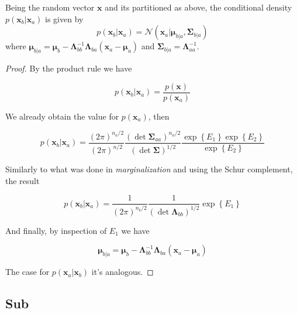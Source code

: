 \begin{appendices}
  \begin{theorem}[Conditioning]
    Being the random vector $\mathbf{x}$ and its partitioned as above, the conditional density $p(\mathbf{x}_b | \mathbf{x}_a)$ is given by
    \begin{displaymath}
      p(\mathbf{x}_b | \mathbf{x}_a) = \mathcal{N}\left( \mathbf{x}_a | \boldsymbol{\mu}_{b|a}, \boldsymbol{\Sigma}_{b|a} \right)
    \end{displaymath}
    where $\boldsymbol{\mu}_{b|a} = \boldsymbol{\mu}_{b}-\boldsymbol{\Lambda}_{b b}^{-1} \boldsymbol{\Lambda}_{b a}\left(\mathbf{x}_{a}-\boldsymbol{\mu}_{a}\right)$ and $\boldsymbol{\Sigma}_{b|a} = \boldsymbol{\Lambda}_{aa}^{-1}$.
  \end{theorem}

  \begin{proof}
    By the product rule we have

    \begin{equation}
      p(\mathbf{x}_b|\mathbf{x}_a)=\frac{p(\mathbf{x})}{p(\mathbf{x}_a)}
    \end{equation}

    We already obtain the value for $p(\mathbf{x}_a)$, then

    \begin{equation}
      p(\mathbf{x}_b|\mathbf{x}_a)=\frac{(2 \pi )^{n_a/2}}{\left( 2 \pi \right)^{n/2}} \frac{( \det \mathbf{\Sigma}_{aa} )^{n_a/2}}{\left( \det \boldsymbol{\Sigma} \right)^{1/2}} \frac{\exp \left\{ E_1 \right\} \exp \left\{ E_2 \right\}}{\exp \left\{ E_2 \right\}}
    \end{equation}
    
    Similarly to what was done in \textit{marginalization} and using the Schur complement, the result

    \begin{equation}
      p(\mathbf{x}_b|\mathbf{x}_a)=\frac{1}{\left( 2 \pi \right)^{n_b/2}} \frac{1}{\left( \det \boldsymbol{\Lambda}_{bb} \right)^{1/2}} \exp \left\{ E_1 \right\}
    \end{equation}

    And finally, by inspection of $E_1$ we have

    \begin{equation}
      \boldsymbol{\mu}_{b|a} =  \boldsymbol{\mu}_{b}-\boldsymbol{\Lambda}_{b b}^{-1} \boldsymbol{\Lambda}_{b a}\left(\mathbf{x}_{a}-\boldsymbol{\mu}_{a}\right)
    \end{equation}

    The case for $p\left( \mathbf{x}_a | \mathbf{x}_b \right)$ it's analogous.

  \end{proof}
  
  

  \subsection{Sub}

\end{appendices}